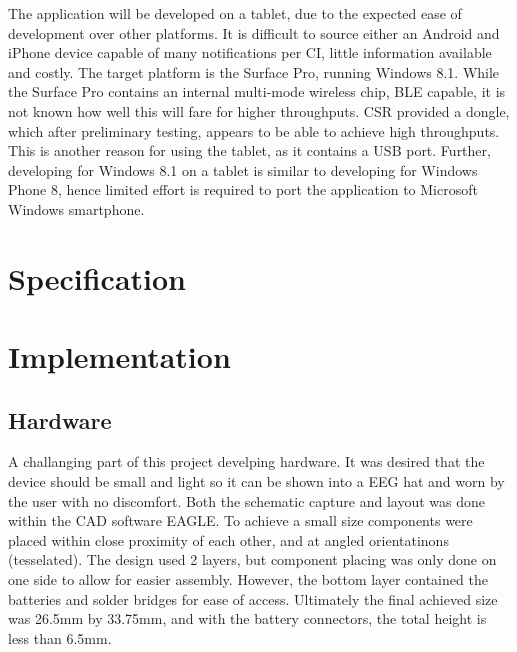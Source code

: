 \documentclass[]{article}
\begin{document}
The application will be developed on a tablet, due to the expected ease of development over other platforms. It is difficult to source either an Android and iPhone device capable of many notifications per \ac{CI}, little information available and costly. The target platform is the Surface Pro, running Windows 8.1. While the Surface Pro contains an internal multi-mode wireless chip, \ac{BLE} capable, it is not known how well this will fare for higher throughputs. \ac{CSR} provided a dongle, which after preliminary testing, appears to be able to achieve high throughputs. This is another reason for using the tablet, as it contains a \ac{USB} port. Further, developing for Windows 8.1 on a tablet is similar to developing for Windows Phone 8, hence limited effort is required to port the application to Microsoft Windows smartphone.


\clearpage
\section{Specification}
\clearpage
\section{Implementation}

\subsection{Hardware}

A challanging part of this project develping hardware. It was desired that the device should be small and light so it can be shown into a \ac{EEG} hat and worn by the user with no discomfort. Both the schematic capture and layout was done within the \ac{CAD} software EAGLE. To achieve a small size components were placed within close proximity of each other, and at angled orientatinons (tesselated). The design used 2 layers, but component placing was only done on one side to allow for easier assembly. However, the bottom layer contained the batteries and solder bridges for ease of access. Ultimately the final achieved size was 26.5mm by 33.75mm, and with the battery connectors, the total height is less than 6.5mm.
\end{document}
